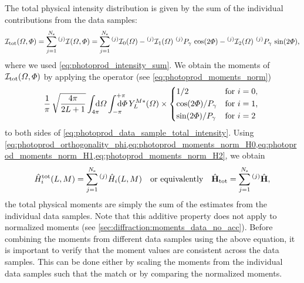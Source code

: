 The total physical intensity distribution is given by the sum of the
individual contributions from the data samples:
\begin{equation}
  \label{eq:photoprod_data_sample_total_intensity}
  \intensity_\text{tot}(\Omega, \Phi)
  = \sum_{j = 1}^{N_\text{s}} \prescript{(j)}{}{\intensity}(\Omega, \Phi)
  = \sum_{j = 1}^{N_\text{s}}
    \prescript{(j)}{}{\intensity_0}(\Omega)
  - \prescript{(j)}{}{\intensity_1}(\Omega)\, \prescript{(j)}{}{P_\gamma}\, \cos(2 \Phi)
  - \prescript{(j)}{}{\intensity_2}(\Omega)\, \prescript{(j)}{}{P_\gamma}\, \sin(2 \Phi),
\end{equation}
where we used \cref{eq:photoprod_intensity_sum}.  We obtain the
moments of $\mathcal{I}_\text{tot}(\Omega, \Phi)$ by applying the
operator (see \cref{eq:photoprod_moments_norm})
\begin{equation}
  \label{eq:photoprod_moments_operator}
  \frac{1}{\pi}\, \sqrt{\frac{4 \pi}{2 L + 1}}
  \int_{4 \pi}\!\!\!\! \dif{\Omega} \int_{-\pi}^{+\pi}\hspace{-1.2em} \dif{\Phi}\,
  Y_L^{M *}(\Omega) \times \begin{cases*}
    1 / 2                   & for $i = 0$, \\
    \cos(2 \Phi) / P_\gamma & for $i = 1$, \\
    \sin(2 \Phi) / P_\gamma & for $i = 2$
  \end{cases*}
\end{equation}
to both sides of
\cref{eq:photoprod_data_sample_total_intensity}.  Using
\cref{eq:photoprod_orthogonality_phi,eq:photoprod_moments_norm_H0,eq:photoprod_moments_norm_H1,eq:photoprod_moments_norm_H2},
we obtain
\begin{equation}
  \label{eq:photoprod_data_sample_phys_moments_total}
  \hat{H}_i^\text{tot}(L, M)
  = \sum_{j = 1}^{N_\text{s}} \prescript{(j)}{}{\vphantom{H}}\hat{H}_i(L, M)
  \quad\text{or equivalently}\quad
  \hat{\vect{H}}_\text{tot}
  = \sum_{j = 1}^{N_\text{s}} \prescript{(j)}{}{\vphantom{\vect{H}}}\hat{\vect{H}},
\end{equation}
\ie the total physical moments are simply the sum of the estimates
from the individual data samples.  Note that this additive property
does not apply to normalized moments (see
\cref{sec:diffraction:moments_data_no_acc}).  Before combining the
moments from different data samples using the above equation, it is
important to verify that the moment values are consistent across the
data samples.  This can be done either by scaling the moments from the
individual data samples such that the
 match
or by comparing the normalized moments.

